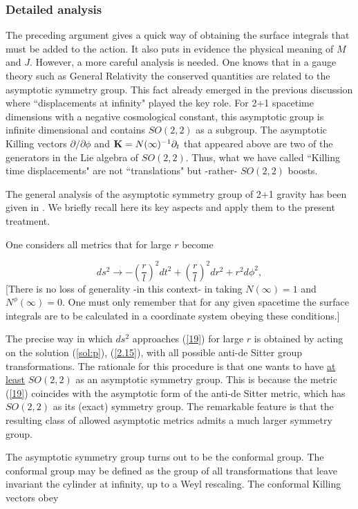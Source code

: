 \documentclass[12pt]{article}
\newcounter{c1} \newcounter{c2}
\newcommand{\bb}{\begin{equation}}
\newcommand{\ee}{\end{equation}}
\newcommand{\p}{\partial}
\begin{document}

\subsubsection{ Detailed analysis}

The preceding argument gives a quick way of obtaining the
surface integrals that must be added to the action. It also puts
in evidence the physical meaning of $M$ and $J$. However, a
more careful analysis is needed. One knows that in a gauge theory such as
 General
Relativity the conserved quantities are related to the
asymptotic symmetry group. This fact already
emerged in the previous discussion where ``displacements at
infinity" played the key role. For 2+1 spacetime dimensions with
a negative cosmological constant, this asymptotic group is
infinite dimensional and contains $SO(2,2)$ as a subgroup. The
asymptotic Killing vectors $\p /\p{\phi}$ and ${\bf K}  =
N(\infty)^{-1}\p_t$ that appeared above are two of the
generators in the Lie algebra of $SO(2,2)$. Thus, what we have
called ``Killing time displacements" are not ``translations"
but -rather- $SO(2,2)$ boosts.

The general analysis of the asymptotic symmetry group
of 2+1 gravity has been given in \cite{6}. We briefly recall
here its key aspects and apply them to the present treatment.

One considers all metrics that for large $r$ become

\bb
ds^2 \longrightarrow -\left(\frac{r}{l}\right)^2 dt^2 +
\left(\frac{r}{l}\right)^2 dr^2 + r^2 d\phi ^2,
\label{19}
\ee
%
[There is no loss of generality -in this context- in taking
$N(\infty) = 1$ and $N^{\phi}(\infty) =0$. One must only
remember that for any given spacetime the surface integrals are
to be calculated in a coordinate system obeying these conditions.]

The precise way in which $ds^2$ approaches (\ref{19}) for large
$r$ is obtained by acting on the solution (\ref{sol:p}),
(\ref{2.15}), with all possible anti-de Sitter group
transformations. The rationale for this procedure is that one
wants to have \underline{at least} $SO(2,2)$ as an asymptotic
symmetry group. This is because the metric (\ref{19}) coincides
with the asymptotic form of the anti-de Sitter metric, which has
$SO(2,2)$ as its (exact) symmetry group.  The remarkable feature
is that the resulting class of allowed asymptotic metrics admits
a much larger symmetry group.

The asymptotic symmetry group turns out to be the conformal
group. The conformal group may be defined as the group of all
transformations that leave invariant the cylinder at infinity,
up to a Weyl rescaling. The conformal Killing vectors obey
\end{document}
